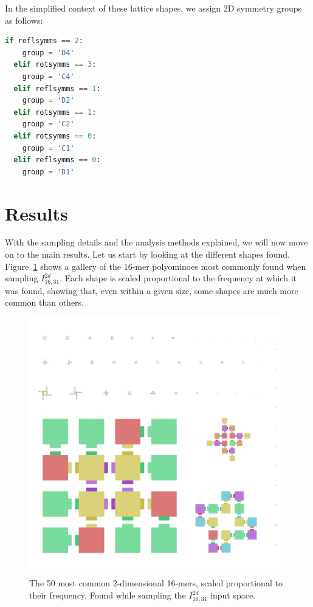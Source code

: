 In the simplified context of these lattice shapes, we assign 2D symmetry groups as follows:
\begin{lstlisting}[language=Python]
  if reflsymms == 2:
    group = 'D4'
  elif rotsymms == 3:
    group = 'C4'
  elif reflsymms == 1:
    group = 'D2'
  elif rotsymms == 1:
    group = 'C2'
  elif rotsymms == 0:
    group = 'C1'
  elif reflsymms == 0:
    group = 'D1'
\end{lstlisting}



\section{Results}

With the sampling details and the analysis methods explained, we will now move on to the main results. Let us start by looking at the different shapes found. Figure~\ref{fig:16-mer_2d_zoo} shows a gallery of the 16-mer polyominoes most commonly found when sampling \(I_{16,31}^{2d}\). Each shape is scaled proportional to the frequency at which it was found, showing that, even within a given size, some shapes are much more common than others.

\begin{figure}[h]
    \centering
    \includegraphics[width=\textwidth]{figures/16-mers_2d.png}
    \caption{The 50 most common 2-dimensional 16-mers, scaled proportional to their frequency. Found while sampling the \(I_{16,31}^{2d}\) input space.}
    \label{fig:16-mer_2d_zoo}
\end{figure}

